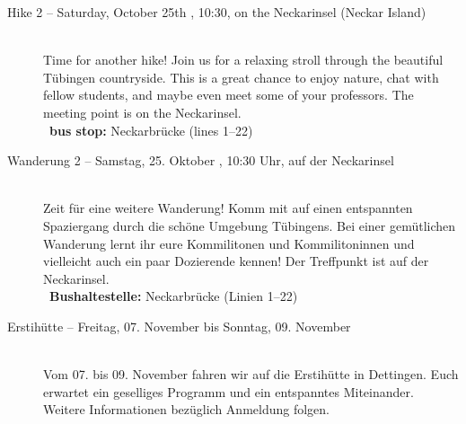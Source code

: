 \begin{description}
\ifml
	\item[Hike 2 -- Saturday, October 25th \YEAR, 10:30, on the Neckarinsel (Neckar Island)]~\\
	Time for another hike! Join us for a relaxing stroll through the beautiful Tübingen countryside.
	This is a great chance to enjoy nature, chat with fellow students, and maybe even meet some of your professors.
	The meeting point is on the Neckarinsel.\\
	~\textbf{bus stop:} Neckarbrücke (lines 1--22)
\else
	\item[Wanderung 2 -- Samstag, 25. Oktober \YEAR, 10:30 Uhr, auf der Neckarinsel]~\\
	Zeit für eine weitere Wanderung! Komm mit auf einen entspannten Spaziergang durch die schöne Umgebung Tübingens.
	Bei einer gemütlichen Wanderung lernt ihr eure Kommilitonen und Kommilitoninnen
	und vielleicht auch ein paar Dozierende kennen!
	Der Treffpunkt ist auf der Neckarinsel.\\
	~\textbf{Bushaltestelle:} Neckarbrücke (Linien 1--22)
\fi



\ifml
\else
   \item[Erstihütte -- Freitag, 07. November bis Sonntag, 09. November \YEAR]~\\
   Vom 07. bis 09. November fahren wir auf die Erstihütte in Dettingen.
   Euch erwartet ein geselliges Programm und ein entspanntes Miteinander.
   Weitere Informationen bezüglich Anmeldung folgen.
\fi


\end{description}
